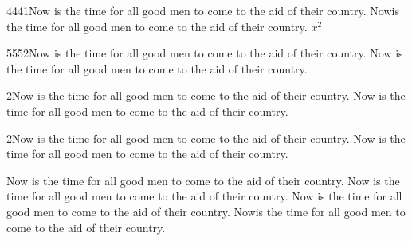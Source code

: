 4441Now is the time for all good men to come to the aid of their country. Nowis the time for all good men to come to the aid of their country. $x^2$ %
\par
5552Now is the time for all good men to come to the aid of their country. Now is the time for all good men to come to the aid of their country.%
\par
\begin{myenv}

	2Now is the time for all good men to come to the aid of their country. Now is the time for all good men to come to the aid of their country.%
	\par
	2Now is the time for all good men to come to the aid of their country. Now is the time for all good men to come to the aid of their country.%

\end{myenv}

Now is the time for all good men to come to the aid of their country. Now is the time for all good men to come to the aid of their country. Now is the time for all good men to come to the aid of their country. Nowis the time for all good men to come to the aid of their country.%
